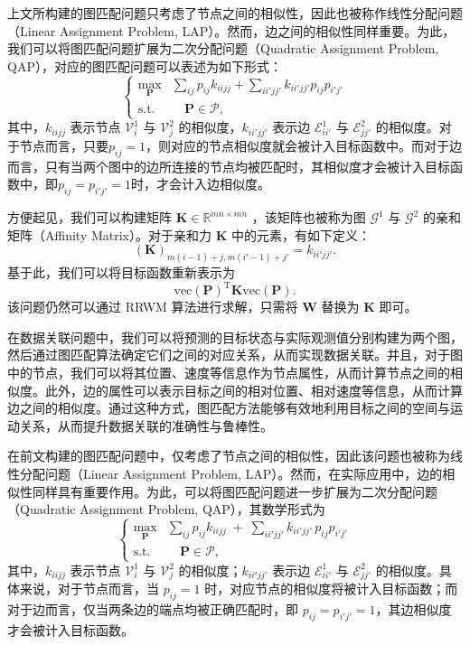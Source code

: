 上文所构建的图匹配问题只考虑了节点之间的相似性，因此也被称作线性分配问题（Linear Assignment Problem, LAP）。然而，边之间的相似性同样重要。为此，我们可以将图匹配问题扩展为二次分配问题（Quadratic Assignment Problem, QAP），对应的图匹配问题可以表述为如下形式：
\[
    \begin{cases}
        \max_{\mathbf P} & \sum_{i j} p_{i j} k_{i i j j} + \sum_{i i' j j'} k_{i i' j j'} p_{i j} p_{i' j'} \\
        \text{s.t.}      & \quad \mathbf P \in \mathcal P ,
    \end{cases}
\]
其中，$k_{i i j j}$ 表示节点 $\mathcal V_i^{1}$ 与 $\mathcal V_j^{2}$ 的相似度，$k_{i i' j j'}$ 表示边 $\mathcal E_{i i'}^{1}$ 与 $\mathcal E_{j j'}^{2}$ 的相似度。对于节点而言，只要\( p_{ij} = 1 \)，则对应的节点相似度就会被计入目标函数中。而对于边而言，只有当两个图中的边所连接的节点均被匹配时，其相似度才会被计入目标函数中，即\( p_{ij} = p_{i'j'} = 1 \)时，才会计入边相似度。

方便起见，我们可以构建矩阵 $\mathbf K \in \mathbb R^{m n \times m n}$ ，该矩阵也被称为图 $\mathcal G^{1}$ 与 $\mathcal G^{2}$ 的亲和矩阵（Affinity Matrix）。对于亲和力 $\mathbf K$ 中的元素，有如下定义：
\[
    (\mathbf{K})_{m(i-1)+j, m(i'-1)+j'} = k_{i i' j j'}.
\]
基于此，我们可以将目标函数重新表示为
\[
    \mathrm{vec}(\mathbf{P})^{\mathrm{T}} \mathbf{K} \mathrm{vec}(\mathbf{P}).
\]
该问题仍然可以通过 RRWM 算法进行求解，只需将 $\mathbf W$ 替换为 $\mathbf K$ 即可。

在数据关联问题中，我们可以将预测的目标状态与实际观测值分别构建为两个图，然后通过图匹配算法确定它们之间的对应关系，从而实现数据关联。并且，对于图中的节点，我们可以将其位置、速度等信息作为节点属性，从而计算节点之间的相似度。此外，边的属性可以表示目标之间的相对位置、相对速度等信息，从而计算边之间的相似度。通过这种方式，图匹配方法能够有效地利用目标之间的空间与运动关系，从而提升数据关联的准确性与鲁棒性。

在前文构建的图匹配问题中，仅考虑了节点之间的相似性，因此该问题也被称为线性分配问题（Linear Assignment Problem, LAP）。然而，在实际应用中，边的相似性同样具有重要作用。为此，可以将图匹配问题进一步扩展为二次分配问题（Quadratic Assignment Problem, QAP），其数学形式为
\[
    \begin{cases}
        \max_{\mathbf P} & \sum_{ij} p_{ij} k_{i i j j} \;+\; \sum_{ii'jj'} k_{i i' j j'} \, p_{ij} p_{i'j'} \\
        \text{s.t.}      & \quad \mathbf P \in \mathcal P ,
    \end{cases}
\]
其中，$k_{i i j j}$ 表示节点 $\mathcal V_i^{1}$ 与 $\mathcal V_j^{2}$ 的相似度；$k_{i i' j j'}$ 表示边 $\mathcal E_{ii'}^{1}$ 与 $\mathcal E_{jj'}^{2}$ 的相似度。具体来说，对于节点而言，当 $p_{ij} = 1$ 时，对应节点的相似度将被计入目标函数；而对于边而言，仅当两条边的端点均被正确匹配时，即 $p_{ij} = p_{i'j'} = 1$，其边相似度才会被计入目标函数。

